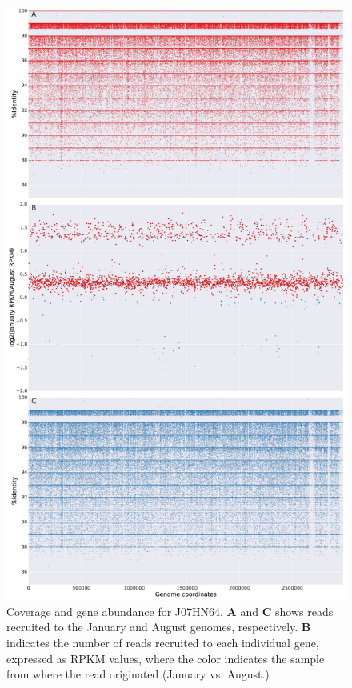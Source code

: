 \begin{figure}[!hbtp]
  \centering
  \includegraphics[width=\textwidth,height=0.8\textheight,keepaspectratio]{Chapter5/Figures/coverage_plots/J07HX64_coverage.pdf}
  \caption{Coverage and gene abundance for J07HN64. \textbf{A} and \textbf{C} shows reads recruited to the January and August genomes, respectively. \textbf{B} indicates the number of reads recruited to each individual gene, expressed as RPKM values, where the color indicates the sample from where the read originated (January vs. August.)}
  \label{J07HN64coverage}
\end{figure}

